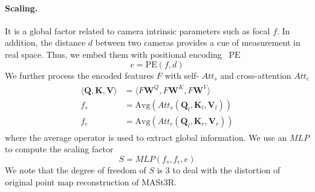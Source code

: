 \paragraph{Scaling.} It is a global factor related to camera intrinsic parameters such as focal $f$. In addition, the distance $d$ between two cameras provides a cue of measurement in real space. Thus, we embed them with positional encoding~\cite{mildenhall2020nerf} $\text{PE}$
\begin{equation}
    e = \text{PE}(f, d)
\end{equation}
We further process the encoded features $F$ with self- $Att_s$ and cross-attention $Att_c$
\begin{align}
\begin{split}
\label{formula:att}
    \langle\mathbf{Q,K,V}\rangle &= \langle F \mathbf{W}^Q, F \mathbf{W}^K, F \mathbf{W}^V \rangle \\
    f_s &= \text{Avg}(Att_s(\mathbf{Q}_l, \mathbf{K}_l, \mathbf{V}_l)) \\
    f_c &= \text{Avg}(Att_c(\mathbf{Q}_l, \mathbf{K}_r, \mathbf{V}_r))
\end{split}
\end{align}
where the average operator is used to extract global information. We use an $MLP$ to compute the scaling factor
\begin{equation}
    S = MLP(f_s, f_c, e)
    \label{eq:scale}
\end{equation}
We note that the degree of freedom of $S$ is 3 to deal with the distortion of original point map reconstruction of MASt3R.

